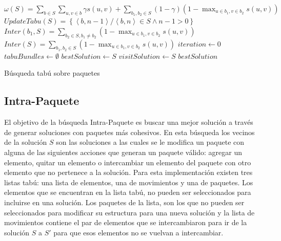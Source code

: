 \begin{center}
	\begin{algorithm}[H]
	\DontPrintSemicolon
	\SetAlgoLined
		$\omega(S) = \sum_{b \in S}{\sum_{u,v \in b}{\gamma s(u,v)}} + \sum_{b_1,b_2 \in S}{(1-\gamma) (1-\max_{u \in b_1, v \in b_2}{s(u,v)})}$\;
		$UpdateTabu(S) = \left\{ \left\langle b, n-1 \right\rangle  / \left\langle b, n \right\rangle \in S \wedge n-1 > 0 \right\}$\;
		$Inter(b_1, S) = \sum_{b_2 \in S, b_1\neq b_2}{(1-\max_{u \in b_1, v \in b_2}{s(u,v)})}$\;
		$Inter(S) = \sum_{b_1, b_2 \in S}{(1-\max_{u \in b_1, v \in b_2}{s(u,v)})}$\;
		$iteration \leftarrow 0$\;
		$tabuBundles \leftarrow \emptyset$\;
		$bestSolution \leftarrow S$\;
		$visitSolution \leftarrow S$\;
		\Return $bestSolution$\;
	\caption{Búsqueda tabú sobre paquetes}\label{alg:algBusTabuBundle}
	\end{algorithm}
\end{center}

\subsection{Intra-Paquete}
El objetivo de la búsqueda Intra-Paquete es buscar una mejor solución a través de generar soluciones con paquetes más cohesivos. En esta búsqueda los vecinos de la solución $S$ son las soluciones a las cuales se le modifica un paquete con alguna de las siguientes acciones que generan un paquete válido: agregar un elemento, quitar un elemento o intercambiar un elemento del paquete con otro elemento que no pertenece a la solución. Para esta implementación existen tres listas tabú: una lista de elementos, una de movimientos y una de paquetes. Los elementos que se encuentran en la lista tabú, no pueden ser seleccionados para incluirse en una solución. Los paquetes de la lista, son los que no pueden ser seleccionados para modificar su estructura para una nueva solución y la lista de movimientos contiene el par de elementos que se intercambiaron para ir de la solución $S$ a $S'$ para que esos elementos no se vuelvan a intercambiar.

